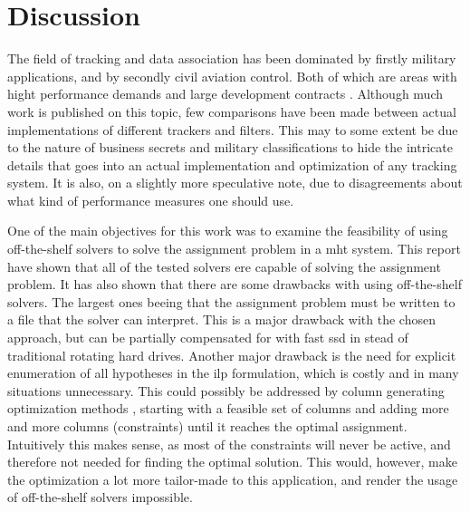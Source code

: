 \section{Discussion}
\label{sec:discussion}
The field of tracking and data association has been dominated by firstly military applications, and by secondly civil aviation control. Both of which are areas with hight performance demands and large development contracts \cite{Blackman2004}. Although much work is published on this topic, few comparisons have been made between actual implementations of different trackers and filters. This may to some extent be due to the nature of business secrets and military classifications to hide the intricate details that goes into an actual implementation and optimization of any tracking system. It is also, on a slightly more speculative note, due to disagreements about what kind of performance measures one should use. 

One of the main objectives for this work was to examine the feasibility of using off-the-shelf solvers to solve the assignment problem in a \gls{mht} system. This report have shown that all of the tested solvers ere capable of solving the assignment problem. It has also shown that there are some drawbacks with using off-the-shelf solvers. The largest ones beeing that the assignment problem must be written to a file that the solver can interpret. This is a major drawback with the chosen approach, but can be partially compensated for with fast \gls{ssd} in stead of traditional rotating hard drives. Another major drawback is the need for explicit enumeration of all hypotheses in the \gls{ilp} formulation, which is costly and in many situations unnecessary. This could possibly be addressed by column generating optimization methods \cite{Barnhart1998}, starting with a feasible set of columns and adding more and more columns (constraints) until it reaches the optimal assignment. Intuitively this makes sense, as most of the constraints will never be active, and therefore not needed for finding the optimal solution. This would, however, make the optimization a lot more tailor-made to this application, and render the usage of off-the-shelf solvers impossible.